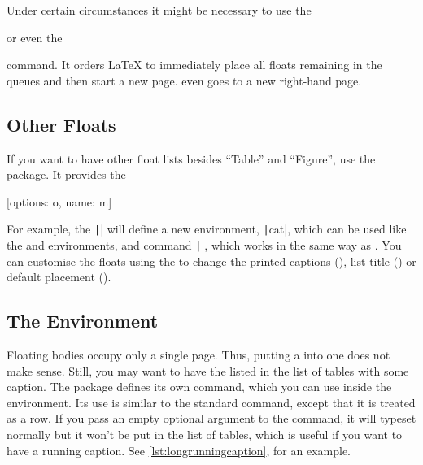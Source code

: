Under certain circumstances it might be necessary to use the
\begin{lscommand}
   or even the 
\end{lscommand}
command. It orders \LaTeX{} to immediately place all floats remaining in the
queues and then start a new page.  even goes to a new
right-hand page.

\subsection{Other Floats}

If you want to have other float lists besides \enquote{Table} and
\enquote{Figure}, use the  package. It provides the
\begin{lscommand}
  [options: o, name: m]
\end{lscommand}
For example, the \texttt|| will
define a new environment, \texttt|cat|, which can be used like
the  and  environments, and command
\texttt|\listofcats|, which works in the same way as
. You can customise the floats using the
 to change the printed captions (), list title
() or default placement ().

\subsection{The  Environment}

Floating bodies occupy only a single page. Thus, putting a  into
one does not make sense. Still, you may want to have the  listed
in the list of tables with some caption. The  package defines
its own  command, which you can use inside the environment. Its use
is similar to the standard  command, except that it is treated as a
row. If you pass an empty optional argument to the  command, it
will typeset normally but it won't be put in the list of tables, which is useful
if you want to have a running caption. See \autoref{lst:longrunningcaption}, for
an example.

